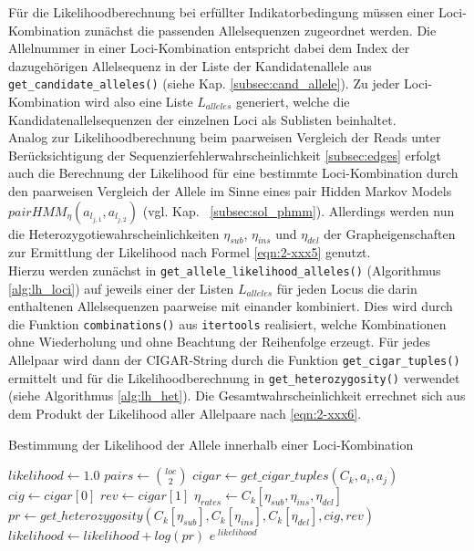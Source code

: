 Für die Likelihoodberechnung bei erfüllter Indikatorbedingung müssen einer Loci-Kombination zunächst die passenden Allelsequenzen zugeordnet werden. Die Allelnummer in einer Loci-Kombination entspricht dabei dem Index der dazugehörigen Allelsequenz in der Liste der Kandidatenallele aus \lstinline|get_candidate_alleles()| (siehe Kap. \ref{subsec:cand_allele}). Zu jeder Loci-Kombination wird also eine Liste $ L_{alleles} $ generiert, welche die Kandidatenallelsequenzen der einzelnen Loci als Sublisten beinhaltet.\\

Analog zur Likelihoodberechnung beim paarweisen Vergleich der Reads unter Berücksichtigung der Sequenzierfehlerwahrscheinlichkeit \ref{subsec:edges} erfolgt auch die Berechnung der Likelihood für eine bestimmte Loci-Kombination durch den paarweisen Vergleich der Allele im Sinne eines pair Hidden Markov Models $ pairHMM_{\eta}(a_{l_{j,1}}, a_{l_{j,2}}) $ (vgl. Kap. ~\ref{subsec:sol_phmm}). Allerdings werden nun die Heterozygotiewahrscheinlichkeiten $\eta_{sub}$, $\eta_{ins}$ und $\eta_{del}$ der Grapheigenschaften zur Ermittlung der Likelihood nach Formel \eqref{eqn:2-xxx5} genutzt.  \\

Hierzu werden zunächst in \lstinline|get_allele_likelihood_alleles()| (Algorithmus \ref{alg:lh_loci}) auf jeweils einer der Listen $L_{alleles}$ für jeden Locus die darin enthaltenen Allelsequenzen paarweise mit einander kombiniert. Dies wird durch die Funktion \lstinline|combinations()| aus \lstinline|itertools| realisiert, welche Kombinationen ohne Wiederholung und ohne Beachtung der Reihenfolge erzeugt. Für jedes Allelpaar wird dann der CIGAR-String durch die Funktion \lstinline|get_cigar_tuples()| ermittelt und für die Likelihoodberechnung in \lstinline|get_heterozygosity()| verwendet (siehe Algorithmus \ref{alg:lh_het}). Die Gesamtwahrscheinlichkeit errechnet sich aus dem Produkt der Likelihood aller Allelpaare nach \ref{eqn:2-xxx6}.

\begin{algorithm}[H]
	\caption{Bestimmung der Likelihood der Allele innerhalb einer Loci-Kombination}  \label{alg:lh_loci}
	\begin{algorithmic}[1]	
		\State $ likelihood \gets 1.0 $
		    \State $ pairs \gets \binom{loc}{2}$
		    \State $cigar \gets get\_cigar\_tuples(C_{k}, a_{i}, a_{j})$  
			        \State $cig \gets cigar[0]$
			        \State $rev \gets cigar[1]$
			        \State $ \eta_{rates} \gets C_{k}[\eta_{sub}, \eta_{ins}, \eta_{del}]$
			        \State $pr \gets get\_heterozygosity(C_{k}[\eta_{sub}], C_{k}[\eta_{ins}], C_{k}[\eta_{del}], cig, rev)$  
			    	\State $ likelihood \gets likelihood + log(pr)$    
			    \EndIf
			\EndFor
		\EndFor
		\State \Return $ e^{\;likelihood} $
		\EndFunction
	\end{algorithmic}
\end{algorithm}

